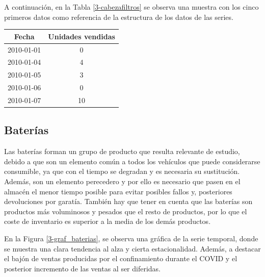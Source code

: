 

A continuación, en la Tabla \ref*{3-cabezafiltros} se observa una muestra con los cinco primeros datos como referencia de la estructura de los datos de las series.

\begin{table}[H]
	{\begin{tabular}{|c|c|}
		\hline
        \textbf{Fecha} & \textbf{Unidades vendidas} \\
        \hline
        2010-01-01 & 0 \\
        \hline
        2010-01-04 & 4 \\
        \hline
        2010-01-05 & 3 \\
        \hline
        2010-01-06 & 0 \\
        \hline
        2010-01-07 & 10 \\
        \hline
	\end{tabular}}
\end{table}


\subsection{Baterías}

Las baterías forman un grupo de producto que resulta relevante de estudio, debido a que son un elemento común a todos los vehículos que puede considerarse consumible, ya que con el tiempo se degradan y es necesaria su sustitución. Además, son un elemento perecedero y por ello es necesario que pasen en el almacén el menor tiempo posible para evitar posibles fallos y, posteriores devoluciones por garatía. También hay que tener en cuenta que las baterías son productos más voluminosos y pesados que el resto de productos, por lo que el coste de inventario es superior a la media de los demás productos.

En la Figura \ref*{3-graf_baterias}, se observa una gráfica de la serie temporal, donde se muestra una clara tendencia al alza y cierta estacionalidad. Además, a destacar el bajón de ventas producidas por el confinamiento durante el COVID y el posterior incremento de las ventas al ser diferidas.

